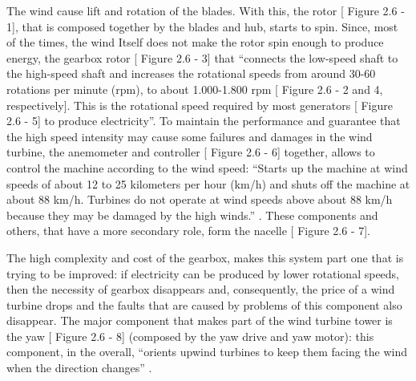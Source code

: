 The wind cause lift and rotation of the blades. With this, the rotor [ Figure 2.6 - 1], that is composed together by the blades and hub, starts to spin. Since, most of the times, the wind Itself does not make the rotor spin enough to produce energy, the gearbox rotor [ Figure 2.6 - 3] that “connects the low-speed shaft to the high-speed shaft and increases the rotational speeds from around 30-60 rotations per minute (rpm), to about 1.000-1.800 rpm [ Figure 2.6 - 2 and 4, respectively]. This is the rotational speed required by most generators [ Figure 2.6 - 5] to produce electricity”. To maintain the performance and guarantee that the high speed intensity may cause some failures and damages in the wind turbine, the anemometer and controller [ Figure 2.6 - 6] together, allows to control the machine according to the wind speed: “Starts up the machine at wind speeds of about 12 to 25 kilometers per hour (km/h) and shuts off the machine at about 88 km/h. Turbines do not operate at wind speeds above about 88 km/h because they may be damaged by the high winds.” \cite{OLD_29_WIND}. These components and others, that have a more secondary role, form the nacelle [ Figure 2.6 - 7].

The high complexity and cost of the gearbox, makes this system part one that is trying to be improved: if electricity can be produced by lower rotational speeds, then the necessity of gearbox disappears and, consequently, the price of a wind turbine drops and the faults that are caused by problems of this component also disappear.
The major component that makes part of the wind turbine tower is the yaw [ Figure 2.6 - 8] (composed by the yaw drive and yaw motor): this component, in the overall, “orients upwind turbines to keep them facing the wind when the direction changes” \cite{OLD_29_WIND}.


